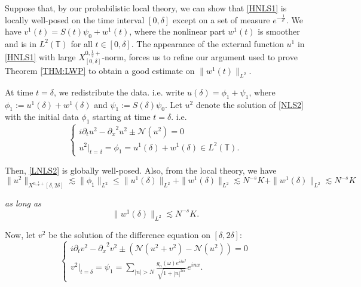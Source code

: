 \documentclass[11pt]{amsart}
\numberwithin{equation}{section} \numberwithin{theorem}{section}
\begin{document}
Suppose that, by our probabilistic local theory, we can show that \eqref{HNLS1} is locally well-posed on the time interval $[0, \delta]$ except on a set of measure $e^{-\frac{1}{{\delta}^c}}$. We have $v^1(t) = S(t) \psi_0 + w^1(t)$, where the nonlinear part $w^1(t)$ is smoother and is in $L^2({\mathbb{T}})$ for all $t \in [0, {\delta}]$. The appearance of the external function $u^1$ in \eqref{HNLS1} with large $X^{0, \frac{1}{2}+}_{[0,  {\delta}]}$-norm, forces us to refine our argument used to prove Theorem \ref{THM:LWP} to obtain a good estimate on $\|w^1(t)\|_{L^2}$.

At time $t = {\delta}$, we redistribute the data. i.e. write $u ({\delta}) = \phi_1 + \psi_1$, where $\phi_1 := u^1({\delta}) + w^1({\delta})$ and $\psi_1 := S({\delta}) \psi_0$. Let $u^2$ denote the solution of \eqref{NLS2} with the initial data $\phi_1$ starting at time $t = {\delta}$. i.e. 
\begin{equation}
	\label{LNLS2} 
	\begin{cases}
		i {
\partial_t} u^2 - {
\partial_x}^2 u^2 \pm \mathcal{N}(u^2) = 0 \\
		u^2|_{t= {\delta}} = \phi_1 = u^1({\delta}) + w^1({\delta}) \in L^2({\mathbb{T}}). 
	\end{cases}
\end{equation}

{
\noindent} Then, \eqref{LNLS2} is globally well-posed. Also, from the local theory, we have 
\begin{equation}
	\label{u2bound} \| u^2 \|_{X^{0, \frac{1}{2}+}[{\delta}, 2{\delta}]} \lesssim \|\phi_1\|_{L^2} \leq \| u^1({\delta})\|_{L^2} + \|w^1({\delta})\|_{L^2} \lesssim N^{-s}K + \|w^1({\delta})\|_{L^2} \lesssim N^{-s} K 
\end{equation}

{
\noindent} {\it as long as} 
\begin{equation}
	\label{w1bound} \|w^1({\delta})\|_{L^2} \lesssim N^{-s}K. 
\end{equation}

Now, let $v^2$ be the solution of the difference equation on $[{\delta}, 2{\delta}]$: 
\begin{equation}
	\label{HNLS2} 
	\begin{cases}
		i {
\partial_t} v^2 - {
\partial_x}^2 v^2 \pm (\mathcal{N} (u^2 + v^2) - \mathcal{N}(u^2)) = 0 \\
		v^2|_{t= {\delta}} = \psi_1 = \sum_{|n|> N} \frac{g_n(\omega)e^{i {\delta} n^2}}{\sqrt{1+|n|^{2{\alpha}}}} e^{inx}. 
	\end{cases}
\end{equation}
\end{document}
